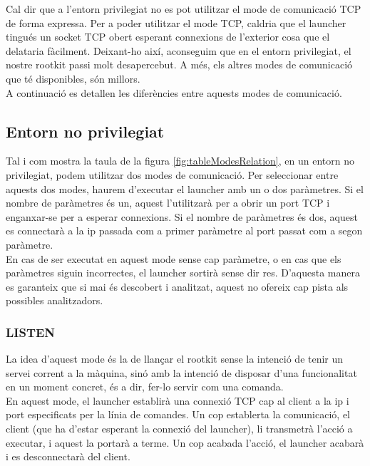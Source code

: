 Cal dir que a l'entorn privilegiat no es pot utilitzar el mode de comunicació TCP de forma expressa. Per a 
poder utilitzar el mode TCP, caldria que el launcher tingués un socket TCP obert esperant connexions de 
l'exterior cosa que el delataria fàcilment. Deixant-ho així, aconseguim que en el entorn privilegiat,
el nostre rootkit passi molt desapercebut. A més, els altres modes de comunicació que té disponibles, són 
millors. \\

A continuació es detallen les diferències entre aquests modes de comunicació.

\subsection{Entorn no privilegiat}

Tal i com mostra la taula de la figura \ref{fig:tableModesRelation}, en un entorn no privilegiat, podem utilitzar dos modes de
comunicació. Per seleccionar entre aquests dos modes, haurem d'executar el launcher amb un o dos paràmetres. Si el nombre de
paràmetres és un, aquest l'utilitzarà per a obrir un port TCP i enganxar-se per a esperar connexions. Si el nombre de paràmetres
és dos, aquest es connectarà a la ip passada com a primer paràmetre al port passat com a segon paràmetre. \\

En cas de ser executat en aquest mode sense cap paràmetre, o en cas que els paràmetres siguin incorrectes, el launcher sortirà
sense dir res. D'aquesta manera es garanteix que si mai és descobert i analitzat, aquest no ofereix cap pista als possibles analitzadors. \\

\subsubsection{LISTEN}
La idea d'aquest mode és la de llançar el rootkit sense la intenció de tenir un servei corrent
a la màquina, sinó amb la intenció de disposar d'una funcionalitat en un moment concret, és a dir, fer-lo servir
com una comanda.\\

En aquest mode, el launcher establirà una connexió TCP cap al client a la ip i port especificats per la línia
de comandes. Un cop establerta la comunicació, el client (que ha d'estar esperant la connexió del launcher), 
li transmetrà l'acció a executar, i aquest la portarà a terme. Un cop acabada l'acció, el launcher acabarà
i es desconnectarà del client. \\

